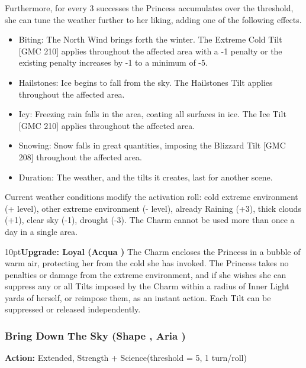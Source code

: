 Furthermore, for every 3 successes the Princess accumulates over the threshold, she can tune the weather further to her liking, adding one of the following effects.

\begin{itemize}
    \item Biting: The North Wind brings forth the winter. The Extreme Cold Tilt [GMC 210] applies throughout the affected area with a -1 penalty or the existing penalty increases by -1 to a minimum of -5.
    \item Hailstones: Ice begins to fall from the sky. The Hailstones Tilt applies throughout the affected area. 
    \item Icy: Freezing rain falls in the area, coating all surfaces in ice. The Ice Tilt [GMC 210] applies throughout the affected area.
    \item Snowing: Snow falls in great quantities, imposing the Blizzard Tilt [GMC 208] throughout the affected area.
    \item Duration: The weather, and the tilts it creates, last for another scene.\end{itemize}
                                                                            
 
Current weather conditions modify the activation roll: cold extreme environment (+ level), other extreme environment (- level), already Raining (+3), thick clouds (+1), clear sky (-1), drought (-3). The Charm cannot be used more
than once a day in a single area.

\begin{myindentpar}{10pt}\textbf{Upgrade: Loyal (Acqua \textbullet\textbullet\textbullet\textbullet)}
The Charm encloses the Princess in a bubble of warm air, protecting her from the cold she has invoked. The Princess takes no penalties or damage from the extreme environment, and if she wishes she can suppress any or all Tilts imposed by the Charm within a radius of Inner Light yards of herself, or reimpose them, as an instant action. Each Tilt can be suppressed or released independently.\end{myindentpar}

\subsubsection*{Bring Down The Sky (Shape \textbullet\textbullet\textbullet\textbullet, Aria \textbullet\textbullet\textbullet)}

\noindent \textbf{Action:} Extended, Strength + Science(threshold = 5, 1 turn/roll)


